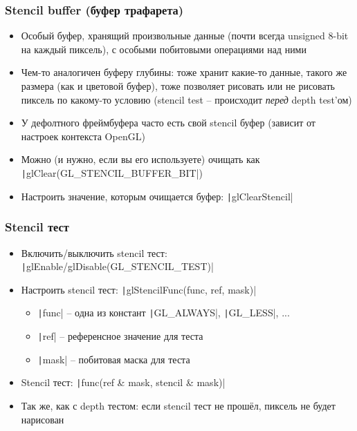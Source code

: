 \documentclass[10pt]{beamer}
\begin{document}
\begin{frame}[fragile]
\frametitle{Stencil buffer (буфер трафарета)}
\begin{itemize}
\item Особый буфер, хранящий произвольные данные (почти всегда unsigned 8-bit на каждый пиксель), с особыми побитовыми операциями над ними
\pause
\item Чем-то аналогичен буферу глубины: тоже хранит какие-то данные, такого же размера (как и цветовой буфер), тоже позволяет рисовать или не рисовать пиксель по какому-то условию (stencil test -- происходит \textit{перед} depth test'ом)
\pause
\item У дефолтного фреймбуфера часто есть свой stencil буфер (зависит от настроек контекста OpenGL)
\pause
\item Можно (и нужно, если вы его используете) очищать как \texttt|glClear(GL_STENCIL_BUFFER_BIT|)
\pause
\item Настроить значение, которым очищается буфер: \texttt|glClearStencil|
\end{itemize}
\end{frame}

\begin{frame}[fragile]
\frametitle{Stencil тест}
\begin{itemize}
\item Включить/выключить stencil тест: \texttt|glEnable/glDisable(GL_STENCIL_TEST)|
\pause
\item Настроить stencil тест: \texttt|glStencilFunc(func, ref, mask)|
\begin{itemize}
\item \texttt|func| -- одна из констант \texttt|GL_ALWAYS|, \texttt|GL_LESS|, ...
\item \texttt|ref| -- референсное значение для теста
\item \texttt|mask| -- побитовая маска для теста
\end{itemize}
\item Stencil тест: \texttt|func(ref & mask, stencil & mask)|
\pause
\item Так же, как с depth тестом: если stencil тест не прошёл, пиксель не будет нарисован
\end{itemize}
\end{frame}
\end{document}
